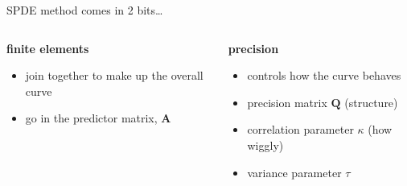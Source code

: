 \documentclass{beamer}
\begin{document}
\begin{frame}{SPDE method comes in 2 bits\ldots}
  \begin{columns}[T]
    \begin{column}{0.40\textwidth}
      \textbf{finite elements}
      \begin{itemize}
        \item join together to make up the overall curve
        \item go in the predictor matrix, $\textbf{A}$
      \end{itemize}
    \end{column}
    \begin{column}{0.58\textwidth}
      \textbf{precision}
      \begin{itemize}
        \item controls how the curve behaves
        \item precision matrix $\textbf{Q}$ (structure)
        \item correlation parameter $\kappa$ (how wiggly)
        \item variance parameter $\tau$ 
      \end{itemize}
    \end{column}
  \end{columns}
\end{frame}

%
%
\end{document}
